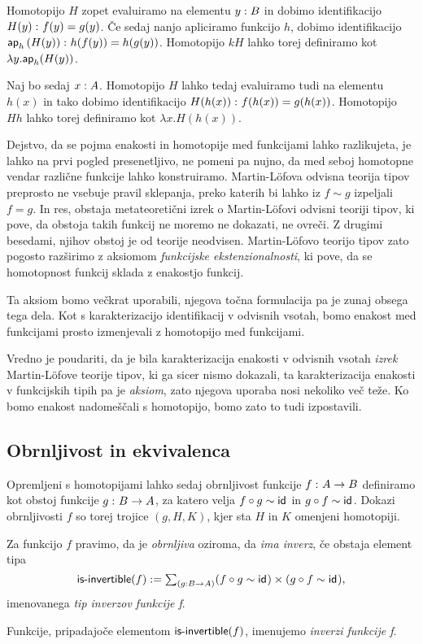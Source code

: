 \begin{dokaz}
  Homotopijo \(H\) zopet evaluiramo na elementu \(y : B\) in dobimo
  identifikacijo \(H(y) \,\colon f(y) = g(y)\). Če sedaj nanjo apliciramo funkcijo \(h\),
  dobimo identifikacijo \(\textnormal{\textsf{ap}}_{h}\,(H(y)) \,\colon h(f(y)) = h(g(y))\). Homotopijo \(kH\) lahko
  torej definiramo kot
  \(\lambda y. \textnormal{\textsf{ap}}_{h}(H(y))\).

  Naj bo sedaj \(x : A\). Homotopijo \(H\) lahko tedaj evaluiramo tudi
  na elementu \(h(x)\) in tako dobimo identifikacijo
  \(H(h(x)) \,\colon f(h(x)) = g(h(x))\). Homotopijo \(Hh\) lahko torej definiramo kot
  \(\lambda x.H(h(x))\).
\end{dokaz}

Dejstvo, da se pojma enakosti in homotopije med funkcijami lahko razlikujeta, je lahko na prvi pogled presenetljivo, ne pomeni pa nujno, da med seboj homotopne vendar različne funkcije lahko konstruiramo. Martin-Löfova odvisna teorija tipov preprosto ne vsebuje pravil sklepanja, preko katerih bi lahko iz \(f \sim g\) izpeljali \(f = g\). In res, obstaja metateoretični izrek o Martin-Löfovi odvisni teoriji tipov, ki pove, da obstoja takih funkcij ne moremo ne dokazati, ne ovreči. Z drugimi besedami, njihov obstoj je od teorije neodvisen. Martin-Löfovo teorijo tipov zato pogosto razširimo z aksiomom \emph{funkcijske ekstenzionalnosti}, ki pove, da se homotopnost funkcij sklada z enakostjo funkcij.

Ta aksiom bomo večkrat uporabili, njegova točna formulacija pa je zunaj obsega tega dela. Kot s karakterizacijo identifikacij v odvisnih vsotah, bomo enakost med funkcijami prosto izmenjevali z homotopijo med funkcijami.

Vredno je poudariti, da je bila karakterizacija enakosti v odvisnih vsotah \emph{izrek} Martin-Löfove teorije tipov, ki ga sicer nismo dokazali, ta karakterizacija enakosti v funkcijskih tipih pa je \emph{aksiom}, zato njegova uporaba nosi nekoliko več teže. Ko bomo enakost nadomeščali s homotopijo, bomo zato to tudi izpostavili.

\subsection{Obrnljivost in ekvivalenca}
Opremljeni s homotopijami lahko sedaj obrnljivost funkcije \(f \,\colon A \to B\) definiramo kot obstoj funkcije \(g \,\colon B \to A\), za katero velja \(f \circ g \sim \textnormal{\textsf{id}}_{}\) in
\(g \circ f \sim \textnormal{\textsf{id}}_{}\). Dokazi obrnljivosti \(f\) so torej trojice \((g, H, K)\), kjer sta \(H\) in \(K\) omenjeni homotopiji.
\begin{definicija}
  Za funkcijo \(f\) pravimo, da je \emph{obrnljiva} oziroma, da \emph{ima inverz},
  če obstaja element tipa
  \[\textnormal{\textsf{is-invertible}}(f) := \textstyle \sum_{\left( g : B \to A \right)} (f \circ g \sim \textnormal{\textsf{id}}_{}) \times (g \circ f \sim \textnormal{\textsf{id}}_{}),\]
  imenovanega \emph{tip inverzov funkcije f}.

  Funkcije, pripadajoče elementom \(\textnormal{\textsf{is-invertible}}(f)\), imenujemo \emph{inverzi funkcije f}.
\end{definicija}

